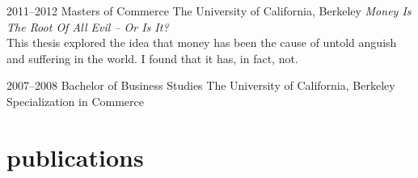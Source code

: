 \documentclass[]{style}
\begin{document}
\begin{entrylist}


\entry
{2011--2012}
{Masters {\normalfont of Commerce}}
{The University of California, Berkeley}
{\emph{Money Is The Root Of All Evil -- Or Is It?} \\ This thesis explored the idea that money has been the cause of untold anguish and suffering in the world. I found that it has, in fact, not.}


\entry
{2007--2008}
{Bachelor {\normalfont of Business Studies}}
{The University of California, Berkeley}
{Specialization in Commerce}


\end{entrylist}



\section{publications}



\end{document}
